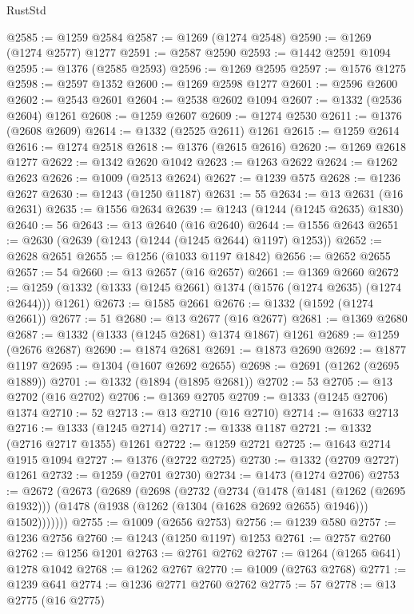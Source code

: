 \begin{lexlean}{RustStd}
\begin{coremodule}
@2585 := @1259 @2584
@2587 := @1269 (@1274 @2548)
@2590 := @1269 (@1274 @2577) @1277
@2591 := @2587 @2590
@2593 := @1442 @2591 @1094
@2595 := @1376 (@2585 @2593)
@2596 := @1269 @2595
@2597 := @1576 @1275
@2598 := @2597 @1352
@2600 := @1269 @2598 @1277
@2601 := @2596 @2600
@2602 := @2543 @2601
@2604 := @2538 @2602 @1094
@2607 := @1332 (@2536 @2604) @1261
@2608 := @1259 @2607
@2609 := @1274 @2530
@2611 := @1376 (@2608 @2609)
@2614 := @1332 (@2525 @2611) @1261
@2615 := @1259 @2614
@2616 := @1274 @2518
@2618 := @1376 (@2615 @2616)
@2620 := @1269 @2618 @1277
@2622 := @1342 @2620 @1042
@2623 := @1263 @2622
@2624 := @1262 @2623
@2626 := @1009 (@2513 @2624)
@2627 := @1239 @575
@2628 := @1236 @2627
@2630 := @1243 (@1250 @1187)
@2631 := 55
@2634 := @13 @2631 (@16 @2631)
@2635 := @1556 @2634
@2639 := @1243 (@1244 (@1245 @2635) @1830)
@2640 := 56
@2643 := @13 @2640 (@16 @2640)
@2644 := @1556 @2643
@2651 := @2630 (@2639 (@1243 (@1244 (@1245 @2644) @1197) @1253))
@2652 := @2628 @2651
@2655 := @1256 (@1033 @1197 @1842)
@2656 := @2652 @2655
@2657 := 54
@2660 := @13 @2657 (@16 @2657)
@2661 := @1369 @2660
@2672 := @1259 (@1332 (@1333 (@1245 @2661) @1374 (@1576 (@1274 @2635) (@1274 @2644))) @1261)
@2673 := @1585 @2661
@2676 := @1332 (@1592 (@1274 @2661))
@2677 := 51
@2680 := @13 @2677 (@16 @2677)
@2681 := @1369 @2680
@2687 := @1332 (@1333 (@1245 @2681) @1374 @1867) @1261
@2689 := @1259 (@2676 @2687)
@2690 := @1874 @2681
@2691 := @1873 @2690
@2692 := @1877 @1197
@2695 := @1304 (@1607 @2692 @2655)
@2698 := @2691 (@1262 (@2695 @1889))
@2701 := @1332 (@1894 (@1895 @2681))
@2702 := 53
@2705 := @13 @2702 (@16 @2702)
@2706 := @1369 @2705
@2709 := @1333 (@1245 @2706) @1374
@2710 := 52
@2713 := @13 @2710 (@16 @2710)
@2714 := @1633 @2713
@2716 := @1333 (@1245 @2714)
@2717 := @1338 @1187
@2721 := @1332 (@2716 @2717 @1355) @1261
@2722 := @1259 @2721
@2725 := @1643 @2714 @1915 @1094
@2727 := @1376 (@2722 @2725)
@2730 := @1332 (@2709 @2727) @1261
@2732 := @1259 (@2701 @2730)
@2734 := @1473 (@1274 @2706)
@2753 := @2672
    (@2673
      (@2689
        (@2698
          (@2732
            (@2734
              (@1478
                (@1481 (@1262 (@2695 @1932)))
                (@1478 (@1938 (@1262 (@1304 (@1628 @2692 @2655) @1946))) @1502)))))))
@2755 := @1009 (@2656 @2753)
@2756 := @1239 @580
@2757 := @1236 @2756
@2760 := @1243 (@1250 @1197) @1253
@2761 := @2757 @2760
@2762 := @1256 @1201
@2763 := @2761 @2762
@2767 := @1264 (@1265 @641) @1278 @1042
@2768 := @1262 @2767
@2770 := @1009 (@2763 @2768)
@2771 := @1239 @641
@2774 := @1236 @2771 @2760 @2762
@2775 := 57
@2778 := @13 @2775 (@16 @2775)

\end{coremodule}
\end{lexlean}
